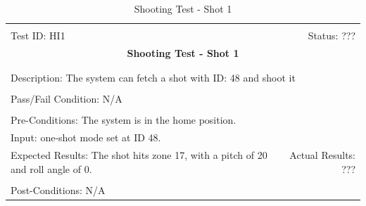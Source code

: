 \documentclass[11pt]{article}
\begin{document}
\begin{center}
\begin{table}[H]
\begin{tabular}{|l r|}\hline&\\[-2mm]
	Test ID: HI1	&Status: ???\\[-3mm]
	\multicolumn{2}{|c|}{\textbf{\large{Shooting Test - Shot 1}}}\\&\\\hline&\\[-3mm]
	\multicolumn{2}{|p{\textwidth}|}{Description: The system can fetch a shot with ID: 48 and shoot it}\\[1mm]\hline&\\[-3mm]
	\multicolumn{2}{|p{\textwidth}|}{Pass/Fail Condition: N/A}\\[1mm]\hline&\\[-3mm]
	\multicolumn{2}{|p{\textwidth}|}{Pre-Conditions: The system is in the home position.}\\[4mm]
	\multicolumn{2}{|p{\textwidth}|}{Input: one-shot mode set at ID 48.}\\[2mm]\hline
	\multicolumn{1}{|p{0.49\textwidth}}{Expected Results: The shot hits zone 17, with a pitch of 20 and roll angle of 0.}	&\multicolumn{1}{|p{0.45\textwidth}|}{Actual Results: ???}\\\hline&\\[-3mm]
	\multicolumn{2}{|p{\textwidth}|}{Post-Conditions: N/A}\\\hline
\end{tabular}
\caption{Shooting Test - Shot 1}
\end{table}
\end{center}
\end{document}
